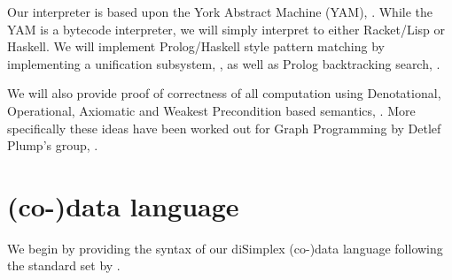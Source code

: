 Our interpreter is based upon the York Abstract Machine (YAM),
\cite{manningPlump2008yorkMachine}. While the YAM is a bytecode interpreter, we
will simply interpret to either Racket/Lisp or Haskell. We will implement
Prolog/Haskell style pattern matching by implementing a unification subsystem,
\cite[section
30.5.1]{krishnamurthi2007programmingLanguagesApplicationInterpretation}, as well
as Prolog backtracking search,
\cite[34.1.1]{krishnamurthi2007programmingLanguagesApplicationInterpretation}.

We will also provide proof of correctness of all computation using Denotational,
Operational, Axiomatic and Weakest Precondition based semantics,
\cite{gunter1992semainticProgrammingLanguages,
winskel1993formalSemanticsProgrammingLanguages, gries1981scienceProgramming,
scott1970theoryComputation, plotkin1981structuralOperationalSemantics,
hoare1969axiomaticSemantics, dijkstra1975guardedCommandsFormalDerivation}. More
specifically these ideas have been worked out for Graph Programming by Detlef
Plump's group, \cite{steinert2007graphProgramming,
plumpSteinert2010semanticsGraphProgramming, poskittPlump2010hoareLogic,
poskittPlump2010hoareCalculus}.

\section{(co-)data language}

We begin by providing the syntax of our diSimplex (co-)data language following the
standard set by \cite{friedmanWand2008essentialsProgrammingLanguages}.

\newcommand{\MExp}[1]{& \textnormal{MExp:} & #1  \nonumber \\}
\newcommand{\denExp}[2]{\ensuremath{ \lbrack \! \lbrack #1 \rbrack \! \rbrack #2}}
\newcommand{\denEql}[3]{\ensuremath{ \lbrack \! \lbrack #1 \rbrack \! \rbrack #2 = #3}}
\newcommand{\Denotation}[1]{& \textnormal{Den:} & #1 \\}
\newcommand{\opExp}[3]{\ensuremath{\langle #1 , #2 \rangle \rightarrow #3}}
\newcommand{\Operational}[1]{& \textnormal{Oper:} & %
 \begin{minipage}{6cm} \begin{prooftree} #1 \end{prooftree} \end{minipage} \nonumber \\}
\newcommand{\Axiomatic}[1]{& \textnormal{Axiom:} & %
 \begin{minipage}{6cm} \begin{prooftree} #1 \end{prooftree} \end{minipage} \nonumber }

